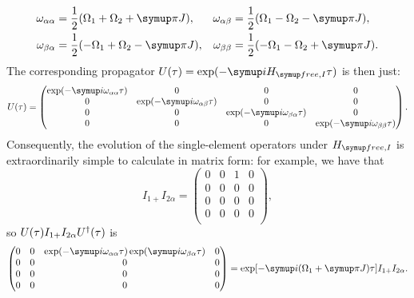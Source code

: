 \begin{equation}
    \label{eq:state_precessions}
    \begin{aligned}
        \omega_{\alpha\alpha} &= \frac{1}{2}(\Omega_1 + \Omega_2 + \cpi J), &
        \omega_{\alpha\beta} &= \frac{1}{2}(\Omega_1 - \Omega_2 - \cpi J), \\
        \omega_{\beta\alpha} &= \frac{1}{2}(-\Omega_1 + \Omega_2 - \cpi J), &
        \omega_{\beta\beta} &= \frac{1}{2}(-\Omega_1 - \Omega_2 + \cpi J).
    \end{aligned}
\end{equation}
The corresponding propagator $U(\tau) = \exp(-\mi\HfreeI\tau)$ is then just:
\begin{equation}
    \label{eq:u_free_weak}
    U(\tau) = \begin{pmatrix}
        \exp(-\mi\omega_{\alpha\alpha}\tau) & 0 & 0 & 0 \\
        0 & \exp(-\mi\omega_{\alpha\beta}\tau) & 0 & 0 \\
        0 & 0 & \exp(-\mi\omega_{\beta\alpha}\tau) & 0 \\
        0 & 0 & 0 & \exp(-\mi\omega_{\beta\beta}\tau) \\
    \end{pmatrix}.
\end{equation}
Consequently, the evolution of the single-element operators under $\HfreeI$ is extraordinarily simple to calculate in matrix form: for example, we have that
\begin{equation}
    \label{eq:single_elem_plusalpha_evolution}
    I_{1+}I_{2\alpha} = \begin{pmatrix}
        0 & 0 & 1 & 0 \\
        0 & 0 & 0 & 0 \\
        0 & 0 & 0 & 0 \\
        0 & 0 & 0 & 0 \\
    \end{pmatrix},
\end{equation}
so $U(\tau) I_{1+} I_{2\alpha} U^\dagger(\tau)$ is
\begin{equation}
    \label{eq:single_elem_plusalpha_evolution_2}
    \begin{pmatrix}
        0 & 0 & \exp(-\mi\omega_{\alpha\alpha}\tau)\exp(\mi\omega_{\beta\alpha}\tau) & 0 \\
        0 & 0 & 0 & 0 \\
        0 & 0 & 0 & 0 \\
        0 & 0 & 0 & 0 \\
    \end{pmatrix} = \exp[-\mi(\Omega_1 + \cpi J)\tau] I_{1+}I_{2\alpha}.
\end{equation}
